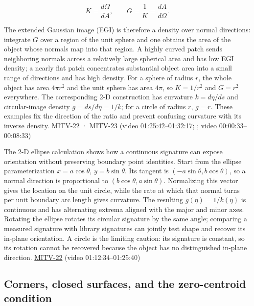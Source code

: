 \[
K=\frac{d\Omega}{dA},\qquad G=\frac{1}{K}=\frac{dA}{d\Omega}.
\]

The extended Gaussian image (EGI) is therefore a density over normal directions: integrate \(G\) over a region of the unit sphere and one obtains the area of the object whose normals map into that region. A highly curved patch sends neighboring normals across a relatively large spherical area and has low EGI density; a nearly flat patch concentrates substantial object area into a small range of directions and has high density. For a sphere of radius \(r\), the whole object has area \(4\pi r^2\) and the unit sphere has area \(4\pi\), so \(K=1/r^2\) and \(G=r^2\) everywhere. The corresponding 2-D construction has curvature \(k=d\eta/ds\) and circular-image density \(g=ds/d\eta=1/k\); for a circle of radius \(r\), \(g=r\). These examples fix the direction of the ratio and prevent confusing curvature with its inverse density. \hyperref[04-visual-computing-ii-ch036-mitv-22---exterior-orientation-recovering-position-orientation-bundle-adjustment-object-shape]{MITV-22} · \hyperref[04-visual-computing-ii-ch036-mitv-23---gaussian-image-solids-of-revolution-direction-histograms-regular-polyhedra]{MITV-23} (video 01:25:42--01:32:17; ; video 00:00:33--00:08:33)

The 2-D ellipse calculation shows how a continuous signature can expose orientation without preserving boundary point identities. Start from the ellipse parameterization \(x=a\cos\theta\), \(y=b\sin\theta\). Its tangent is \((-a\sin\theta,b\cos\theta)\), so a normal direction is proportional to \((b\cos\theta,a\sin\theta)\). Normalizing this vector gives the location on the unit circle, while the rate at which that normal turns per unit boundary arc length gives curvature. The resulting \(g(\eta)=1/k(\eta)\) is continuous and has alternating extrema aligned with the major and minor axes. Rotating the ellipse rotates its circular signature by the same angle; comparing a measured signature with library signatures can jointly test shape and recover its in-plane orientation. A circle is the limiting caution: its signature is constant, so its rotation cannot be recovered because the object has no distinguished in-plane direction. \hyperref[04-visual-computing-ii-ch036-mitv-22---exterior-orientation-recovering-position-orientation-bundle-adjustment-object-shape]{MITV-22} (video 01:12:34--01:25:40)

\subsection{Corners, closed surfaces, and the zero-centroid condition}\label{04-visual-computing-ii-ch032-corners-closed-surfaces-and-the-zero-centroid-condition}

